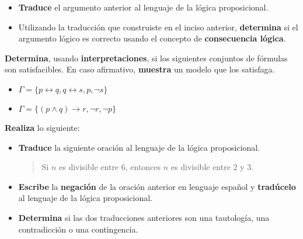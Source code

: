 \documentclass[oneside]{style}
\begin{document}
\begin{questions}[label=\protect\circled{\bfseries\arabic*}]
{\begin{itemize}
            \begin{quote}
                \centering
                Este número es par o este número es impar. Este número no es 
                par. Por lo tanto, este número es impar.
            \end{quote}
    
            \item \textbf{Traduce} el argumento anterior al lenguaje de la lógica 
            proposicional.
    
            \item Utilizando la traducción que construiste en el inciso anterior, 
            \textbf{determina} si el argumento lógico es correcto usando el 
            concepto de \textbf{consecuencia lógica}.
        \end{itemize}
    }

    \question
    {
        \textbf{Determina}, usando \textbf{interpretaciones}, si los siguientes 
        conjuntos de fórmulas son satisfacibles. En caso afirmativo, 
        \textbf{muestra} un modelo que los satisfaga.
        \begin{itemize}
            \item $\Gamma = \{p \leftrightarrow q, q \leftrightarrow s, p, 
            \neg s\}$
            \item $\Gamma = \{(p \land q) \rightarrow r, \neg r, \neg p\}$
        \end{itemize}
    }

    \question
    {
        \textbf{Realiza} lo siguiente:
        \begin{itemize}
            \item \textbf{Traduce} la siguiente oración al lenguaje de la 
            lógica proposicional. 

            \begin{quote}
                \centering
                Si $n$ es divisible entre $6$, entonces $n$ es divisible 
                entre $2$ y $3$. 
            \end{quote}

            \item \textbf{Escribe} la \textbf{negación} de la oración anterior 
            en lenguaje español y \textbf{tradúcelo} al lenguaje de la lógica 
            proposicional.

            \item \textbf{Determina} si las dos traducciones anteriores son 
            una tautología, una contradicción o una contingencia. 
        \end{itemize}
    }


\end{questions}
\end{document}
